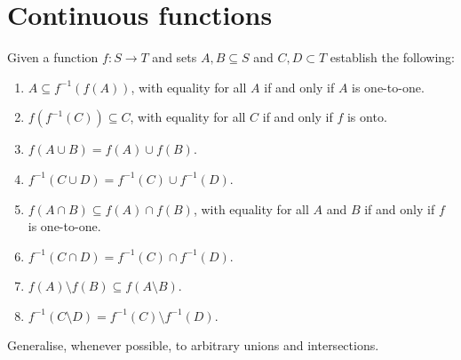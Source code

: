 \section{Continuous functions}


\begin{exercise}{1}
Given a function $f:S\to T$ and sets $A,B\subseteq S$ and $C,D\subset T$ establish the following:
\begin{enumerate}
    \item $A \subseteq f^{-1}(f(A))$, with equality for all $A$ if and only if $A$ is one-to-one.
    \item $f(f^{-1}(C))\subseteq C$, with equality for all $C$ if and only if $f$ is onto.
    \item $f(A\cup B)= f(A)\cup f(B)$.
    \item $f^{-1}(C\cup D)=f^{-1}(C)\cup f^{-1}(D)$.
    \item $f(A\cap B)\subseteq f(A)\cap f(B)$, with equality for all $A$ and $B$ if and only if $f$ is one-to-one.
    \item $f^{-1}(C\cap D)=f^{-1}(C)\cap f^{-1}(D)$.
    \item $f(A)\setminus f(B)\subseteq f(A\setminus B)$.
    \item $f^{-1}(C\setminus D)= f^{-1}(C)\setminus f^{-1}(D)$.
\end{enumerate}
Generalise, whenever possible, to arbitrary unions and intersections.
\end{exercise}
